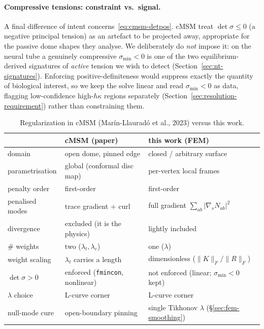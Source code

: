\documentclass[11pt]{article}
\begin{document}
\paragraph{Compressive tensions: constraint vs.\ signal.}  A final difference of intent
concerns~\eqref{eq:cmsm-detpos}.  cMSM treat $\det\sigma\le0$ (a negative principal
tension) as an artefact to be projected away, appropriate for the passive dome shapes
they analyse.  We deliberately do \emph{not} impose it: on the neural tube a genuinely
compressive $\sigma_{\min}<0$ is one of the two equilibrium-derived signatures of
\emph{active} tension we wish to detect (Section~\ref{sec:nt-signatures}).
Enforcing positive-definiteness would suppress exactly the quantity of biological
interest, so we keep the solve linear and read $\sigma_{\min}<0$ as data, flagging
low-confidence high-$h\kappa$ regions separately (Section~\ref{sec:resolution-requirement})
rather than constraining them.

\begin{table}[ht]\centering
\caption{Regularization in cMSM (Mar\'in-Llaurad\'o et al., 2023) versus this work.}
\label{tab:reg-compare}
\begin{tabular}{lll}
\toprule
 & cMSM (paper) & this work (FEM) \\
\midrule
domain          & open dome, pinned edge      & closed / arbitrary surface \\
parametrisation & global (conformal disc map) & per-vertex local frames \\
penalty order   & first-order                 & first-order \\
penalised modes & trace gradient $+$ curl     & full gradient $\sum_{ab}|\nabla_s N_{ab}|^2$ \\
divergence      & excluded (it is the physics)& lightly included \\
\# weights      & two ($\lambda_t,\lambda_c$) & one ($\lambda$) \\
weight scaling  & $\lambda_t$ carries a length& dimensionless ($\|K\|_F/\|R\|_F$) \\
$\det\sigma>0$  & enforced (\texttt{fmincon}, nonlinear) & not enforced (linear; $\sigma_{\min}<0$ kept) \\
$\lambda$ choice& L-curve corner              & L-curve corner \\
null-mode cure  & open-boundary pinning       & single Tikhonov $\lambda$ (\S\ref{sec:fem-smoothing}) \\
\bottomrule
\end{tabular}
\end{table}
\end{document}
